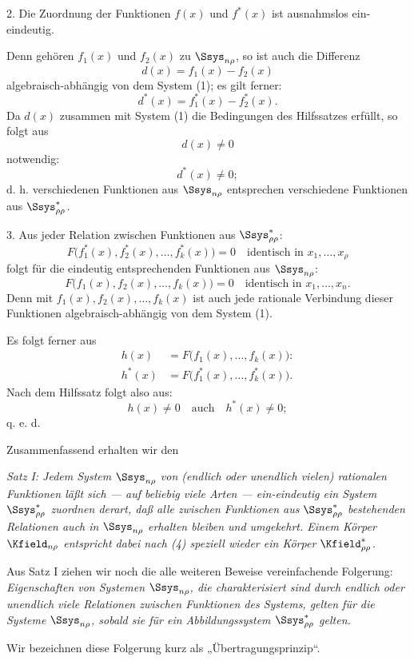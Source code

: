 \documentclass[11pt]{article}
\begin{document}
2. Die Zuordnung der Funktionen $f(x)$ und $f^*(x)$ ist ausnahmslos ein-eindeutig.

Denn gehören $f_1(x)$ und $f_2(x)$ zu $\Ssys_{n\rho}$, so ist auch die Differenz
\[
  d(x)=f_1(x)-f_2(x)
\]
algebraisch-abhängig von dem System (1); es gilt ferner:
\[
  d^*(x)=f_1^*(x)-f_2^*(x).
\]
Da $d(x)$ zusammen mit System (1) die Bedingungen des Hilfssatzes erfüllt, so folgt aus
\[
  d(x)\ne0
\]
notwendig:
\[
  d^*(x)\ne0;
\]
d. h. verschiedenen Funktionen aus $\Ssys_{n\rho}$ entsprechen verschiedene Funktionen aus $\Ssys^*_{\rho\rho}$.

3. Aus jeder Relation zwischen Funktionen aus $\Ssys^*_{\rho\rho}$:
\[
  F\bigl(f_1^*(x),f_2^*(x),\ldots,f_k^*(x)\bigr)=0
  \quad\text{identisch in }x_1,\ldots,x_\rho
\]
folgt für die eindeutig entsprechenden Funktionen aus $\Ssys_{n\rho}$:
\[
  F\bigl(f_1(x),f_2(x),\ldots,f_k(x)\bigr)=0
  \quad\text{identisch in }x_1,
\ldots,x_n.
\]
Denn mit $f_1(x),f_2(x),\ldots,f_k(x)$ ist auch jede rationale Verbindung dieser Funktionen algebraisch-abhängig von dem System (1).

Es folgt ferner aus
\begin{equation}
\begin{aligned}
 h(x)&=F\bigl(f_1(x),\ldots,f_k(x)\bigr):\\
 h^*(x)&=F\bigl(f_1^*(x),\ldots,f_k^*(x)\bigr).
\end{aligned}
\tag{4}
\end{equation}
Nach dem Hilfssatz folgt also aus:
\[
  h(x)\ne0\quad\text{auch}\quad h^*(x)\ne0;
\]
q. e. d.

Zusammenfassend erhalten wir den

\emph{Satz I: Jedem System $\Ssys_{n\rho}$ von (endlich oder unendlich vielen) rationalen Funktionen läßt sich --- auf beliebig viele Arten --- ein-eindeutig ein System $\Ssys^*_{\rho\rho}$ zuordnen derart, daß alle zwischen Funktionen aus $\Ssys^*_{\rho\rho}$ bestehenden Relationen auch in $\Ssys_{n\rho}$ erhalten bleiben und umgekehrt. Einem Körper $\Kfield_{n\rho}$ entspricht dabei nach (4) speziell wieder ein Körper $\Kfield^*_{\rho\rho}$.}

Aus Satz I ziehen wir noch die alle weiteren Beweise vereinfachende Folgerung: \emph{Eigenschaften von Systemen $\Ssys_{n\rho}$, die charakterisiert sind durch endlich oder unendlich viele Relationen zwischen Funktionen des Systems, gelten für die Systeme $\Ssys_{n\rho}$, sobald sie für ein Abbildungssystem $\Ssys^*_{\rho\rho}$ gelten.}

Wir bezeichnen diese Folgerung kurz als „Übertragungsprinzip“.
\end{document}
